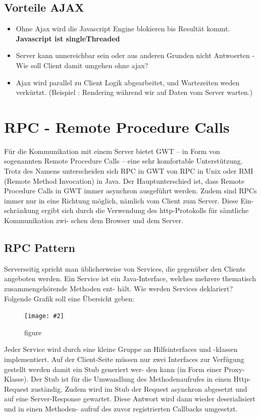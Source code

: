 \documentclass[a4paper,10pt]{scrreprt}
\newcommand{\pic}[2][figure]{\begin{figure}[h]
 \centering
 \texttt{[image: \#2]}
 \caption{#1}
\end{figure}
}
\begin{document}
\subsection{Vorteile AJAX}
\begin{itemize}
 \item Ohne Ajax wird die Javascript Engine blokieren bis Resultät kommt. \textbf{Javascript ist singleThreaded}
 \item Server kann unnereichbar sein oder aus anderen Grunden nicht Antwoerten - Wie soll Client damit umgehen ohne 
ajax?
\item Ajax wird parallel zu Client Logik abgearbeitet, und Wartezeiten weden verkürtzt. (Beispiel : Rendering während 
wir auf Daten vom Server warten.)
\end{itemize}

\section{RPC - Remote Procedure Calls}
Für die Kommunikation mit einem Server bietet GWT – in Form von sogenannten Remote Procedure
Calls – eine sehr komfortable Unterstützung. Trotz des Namens unterscheiden sich RPC in GWT von
RPC in Unix oder RMI (Remote Method Invocation) in Java.
Der Hauptunterschied ist, dass Remote Procedure Calls in GWT immer asynchron ausgeführt werden.
Zudem sind RPCs immer nur in eine Richtung möglich, nämlich vom Client zum Server. Diese Ein-
schränkung ergibt sich durch die Verwendung des http-Protokolls für sämtliche Kommunikation zwi-
schen dem Browser und dem Server.
\subsection{RPC Pattern}
Serverseitig spricht man üblicherweise von Services, die gegenüber den Clients angeboten werden.
Ein Service ist ein Java-Interface, welches mehrere thematisch zusammengehörende Methoden ent-
hält.
Wie werden Services deklariert? Folgende Grafik soll eine Übersicht geben:
\pic{rpc.png}
Jeder Service wird durch eine kleine Gruppe an Hilfsinterfaces und -klassen implementiert. Auf der
Client-Seite müssen nur zwei Interfaces zur Verfügung gestellt werden damit ein Stub generiert wer-
den kann (in Form einer Proxy-Klasse). Der Stub ist für die Umwandlung des Methodenaufrufes in
einen Http-Request zuständig. Zudem wird im Stub der Request asynchron abgesetzt und auf eine
Server-Response gewartet. Diese Antwort wird dann wieder deserialisiert und in einen Methoden-
aufruf des zuvor registrierten Callbacks umgesetzt.
\end{document}
